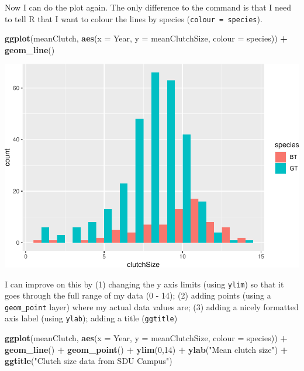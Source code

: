 \documentclass[
  a4paperpaper,
]{book}
\newenvironment{Shaded}{\begin{snugshade}}{\end{snugshade}}
\newcommand{\DataTypeTok}[1]{\textcolor[rgb]{0.13,0.29,0.53}{#1}}
\newcommand{\DecValTok}[1]{\textcolor[rgb]{0.00,0.00,0.81}{#1}}
\newcommand{\KeywordTok}[1]{\textcolor[rgb]{0.13,0.29,0.53}{\textbf{#1}}}
\newcommand{\NormalTok}[1]{#1}
\newcommand{\OperatorTok}[1]{\textcolor[rgb]{0.81,0.36,0.00}{\textbf{#1}}}
\newcommand{\StringTok}[1]{\textcolor[rgb]{0.31,0.60,0.02}{#1}}
\begin{document}
Now I can do the plot again. The only difference to the command is that I need to tell R that I want to colour the lines by species (\texttt{colour\ =\ species}).

\begin{Shaded}
\begin{Highlighting}[]
\KeywordTok{ggplot}\NormalTok{(meanClutch, }\KeywordTok{aes}\NormalTok{(}\DataTypeTok{x =}\NormalTok{ Year, }\DataTypeTok{y =}\NormalTok{ meanClutchSize, }\DataTypeTok{colour =}\NormalTok{ species)) }\OperatorTok{+}
\StringTok{         }\KeywordTok{geom\_line}\NormalTok{()}
\end{Highlighting}
\end{Shaded}

\includegraphics{BB852_files/figure-latex/unnamed-chunk-84-1.pdf}

I can improve on this by (1) changing the y axis limits (using \texttt{ylim}) so that it goes through the full range of my data (0 - 14); (2) adding points (using a \texttt{geom\_point} layer) where my actual data values are; (3) adding a nicely formatted axis label (using \texttt{ylab}); adding a title (\texttt{ggtitle})

\begin{Shaded}
\begin{Highlighting}[]
\KeywordTok{ggplot}\NormalTok{(meanClutch, }\KeywordTok{aes}\NormalTok{(}\DataTypeTok{x =}\NormalTok{ Year, }\DataTypeTok{y =}\NormalTok{ meanClutchSize, }\DataTypeTok{colour =}\NormalTok{ species)) }\OperatorTok{+}
\StringTok{  }\KeywordTok{geom\_line}\NormalTok{() }\OperatorTok{+}\StringTok{ }
\StringTok{  }\KeywordTok{geom\_point}\NormalTok{() }\OperatorTok{+}
\StringTok{  }\KeywordTok{ylim}\NormalTok{(}\DecValTok{0}\NormalTok{,}\DecValTok{14}\NormalTok{) }\OperatorTok{+}\StringTok{ }
\StringTok{  }\KeywordTok{ylab}\NormalTok{(}\StringTok{"Mean clutch size"}\NormalTok{) }\OperatorTok{+}
\StringTok{  }\KeywordTok{ggtitle}\NormalTok{(}\StringTok{"Clutch size data from SDU Campus"}\NormalTok{)}
\end{Highlighting}
\end{Shaded}
\end{document}
